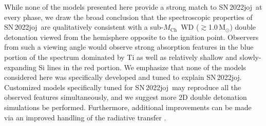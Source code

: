 \documentclass[twocolumn]{aastex631}
\newcommand{\sn}{SN\,2022joj}
\newcommand{\Mch}{$M_\mathrm{Ch}$}
\begin{document}
\begin{CJK*}{UTF8}{gbsn}

While none of the models presented here provide a strong match to \sn\ at every phase, we draw the broad conclusion that the spectroscopic properties of \sn\ are qualitatively consistent with a sub-\Mch\ WD ($\gtrsim$1.0\,$\mathrm{M_\odot}$) double detonation viewed from the hemisphere opposite to the ignition point. Observers from such a viewing angle would observe strong absorption features in the blue portion of the spectrum dominated by Ti as well as relatively shallow and slowly-expanding Si lines in the red portion. We emphasize that none of the models considered here was specifically developed and tuned to explain \sn. Customized models specifically tuned for \sn\ may reproduce all the observed features simultaneously, and we suggest more 2D double detonation simulations be performed. Furthermore, additional improvements can be made via an improved handling of the radiative transfer \citep[e.g., non-LTE effects; see][]{Shen_NLTE_2021}.


\end{CJK*}
\end{document}
